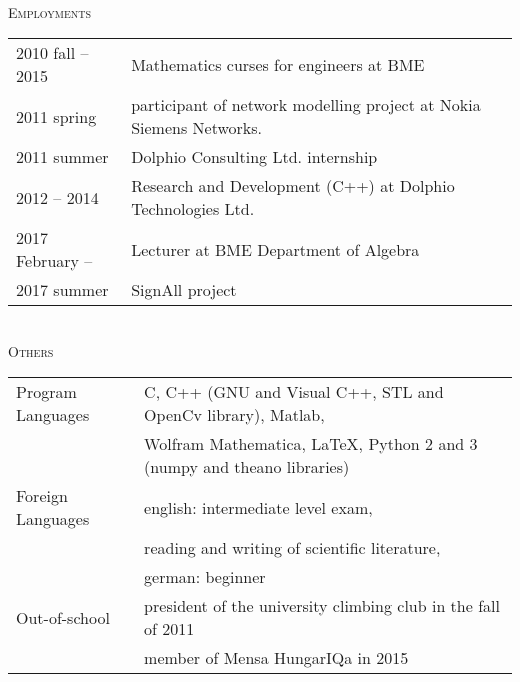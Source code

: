 \documentclass[12pt]{article}
\begin{document}
 \vspace{0.3cm}
 \thispagestyle{empty}
 { \ } \\
 \textsc{Employments}
 \vspace{0.3cm}
 \\
       \begin{tabular}{p{4cm}l}
	       2010 fall -- 2015 & Mathematics curses for engineers at BME\\
           2011 spring  & participant of network modelling project at Nokia Siemens Networks. \\
		   2011 summer    & Dolphio Consulting Ltd. internship\\
		   2012 -- 2014 & Research and Development (C++) at Dolphio Technologies Ltd. \\
           2017 February -- & Lecturer at BME Department of Algebra \\
           2017 summer & SignAll project
       \end{tabular}
 \vspace{0.3cm}
 \\
 \textsc{Others}
 \vspace{0.3cm}
 \\
        \begin{tabular}{p{3cm}l}
	       Program Languages &  C, C++ (GNU and Visual C++, STL and OpenCv library), Matlab, \\
                             & Wolfram Mathematica, \LaTeX, Python 2 and 3 (numpy and theano libraries)\\
           Foreign Languages & english: intermediate level exam,\\
                &reading and writing of scientific literature, \\
                & german: beginner\\
		   Out-of-school & president of the university climbing club in the fall of 2011\\
                & member of Mensa HungarIQa in 2015
       \end{tabular}
\end{document}
